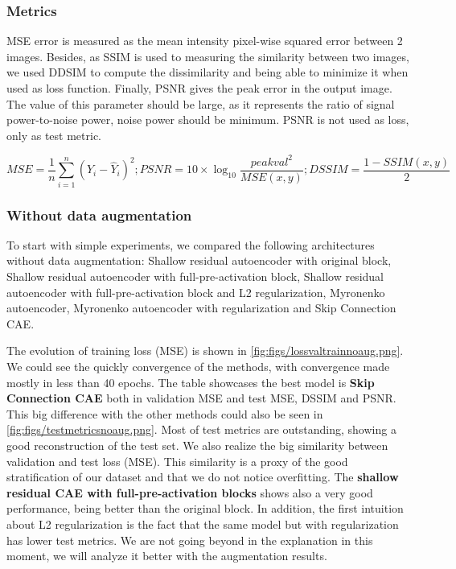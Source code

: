 \subsubsection{Metrics}

MSE error is measured as the mean intensity pixel-wise squared error between 2 images. Besides, as SSIM is used to measuring the similarity between two images, we used DDSIM to compute the dissimilarity and being able to minimize it when used as loss function. Finally, PSNR gives the peak error in the output image. The value of this parameter should be large, as it represents the ratio of signal power-to-noise power, noise power should be minimum. PSNR is not used as loss, only as test metric. 

$$MSE = \frac{1}{n} \sum^{n}_{i=1}(Y_i-\hat{Y}_i)^2; PSNR=10\times \log_{10}\frac{peakval^2}{MSE(x,y)}; DSSIM = \frac{1-SSIM(x,y)}{2}$$


\subsubsection{Without data augmentation}

To start with simple experiments, we compared the following architectures without data augmentation: Shallow residual autoencoder with original block,  Shallow residual autoencoder with full-pre-activation block, Shallow residual autoencoder with full-pre-activation block and L2 regularization, Myronenko autoencoder, Myronenko autoencoder with regularization and Skip Connection CAE.


The evolution of training loss (MSE) is shown in \ref{fig:figs/lossvaltrainnoaug.png}. We could see the quickly convergence of the methods, with convergence made mostly in less than 40 epochs. The table \label{table:expnodaug} showcases the best model is \textbf{Skip Connection CAE} both in validation MSE and test MSE, DSSIM and PSNR. This big difference with the other methods could also be seen in \ref{fig:figs/testmetricsnoaug.png}. Most of test metrics are outstanding, showing a good reconstruction of the test set. We also realize the big similarity between validation and test loss (MSE). This similarity is a proxy of the good stratification of our dataset and that we do not notice overfitting. The \textbf{shallow residual CAE with full-pre-activation blocks} shows also a very good performance, being better than the original block. In addition, the first intuition about L2 regularization is the fact that the same model but with regularization has lower test metrics. We are not going beyond in the explanation in this moment, we will analyze it better with the augmentation results.

